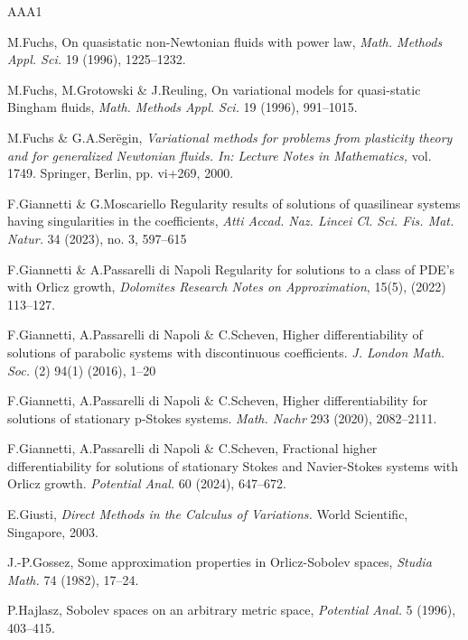 \documentclass[leqno,11pt]{amsart}%
\numberwithin{equation}{section}
\theoremstyle{definition}
\numberwithin{equation}{section}
\begin{document}
\begin{thebibliography}{AAA1}
 


  M.Fuchs, On quasistatic non-Newtonian fluids with power law,
\textit{Math. Methods Appl. Sci.}  19 (1996), 1225--1232.


 

  M.Fuchs, M.Grotowski \& J.Reuling, On variational models for quasi-static Bingham fluids,
\textit{Math. Methods Appl. Sci.}  19 (1996), 991--1015.




M.Fuchs \& G.A.Ser\"egin,
\newblock \textit{Variational methods for problems from plasticity theory and for generalized
Newtonian fluids. In: Lecture Notes in Mathematics,} vol. 1749.
\newblock Springer, Berlin, pp. vi+269, 2000.

 F.Giannetti \& G.Moscariello \newblock Regularity results of solutions of quasilinear systems having singularities
in the coefficients,  \newblock \textit{Atti Accad. Naz. Lincei Cl. Sci. Fis. Mat. Natur.} 34 (2023), no. 3, 597--615


  F.Giannetti \& A.Passarelli di Napoli  \newblock Regularity for solutions to a class of PDE’s with Orlicz growth, \newblock \textit{Dolomites Research Notes on Approximation}, 15(5),  (2022) 113--127.


 F.Giannetti, A.Passarelli di Napoli \& C.Scheven,  \newblock Higher differentiability of solutions of parabolic
systems with discontinuous coefficients. \newblock \textit{J. London Math. Soc.} (2) 94(1) (2016), 1--20 

 F.Giannetti, A.Passarelli di Napoli \& C.Scheven,
Higher differentiability for solutions of stationary p‐Stokes systems.
\newblock \textit{Math. Nachr} 293 (2020),  2082--2111.

  F.Giannetti, A.Passarelli di Napoli \& C.Scheven, 
  Fractional higher differentiability for solutions of stationary Stokes and Navier-Stokes systems with Orlicz growth.
\textit{Potential Anal.} 60 (2024),  647--672.


E.Giusti,
\newblock \textit{Direct Methods in the Calculus of Variations.}
\newblock World Scientific, Singapore, 2003.

 J.-P.Gossez,
Some approximation properties in Orlicz-Sobolev spaces,
\newblock \textit{Studia Math.} 74 (1982), 17--24.

 P.Hajlasz,
Sobolev spaces on an arbitrary metric space,
\newblock \textit{Potential Anal.} 5 (1996),  403--415.


\end{thebibliography}
\end{document}
